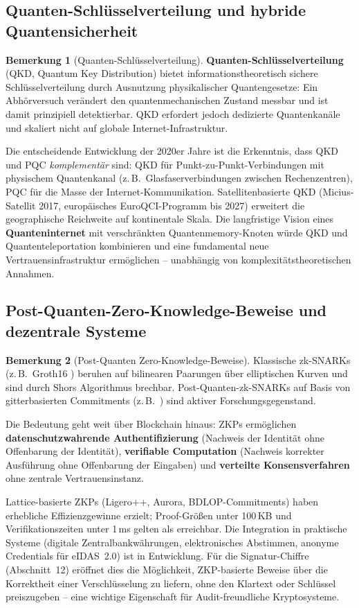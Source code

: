 ﻿\documentclass[a4paper,12pt]{article}
\theoremstyle{definition}
\newtheorem{bemerkung}{Bemerkung}[section]
\begin{document}
\subsection{Quanten-Schlüsselverteilung und hybride Quantensicherheit}

\begin{bemerkung}[Quanten-Schlüsselverteilung]
\textbf{Quanten-Schlüsselverteilung} (QKD, Quantum Key Distribution)
\cite{BB84} bietet informationstheoretisch sichere Schlüsselverteilung
durch Ausnutzung physikalischer Quantengesetze: Ein Abhörversuch
verändert den quantenmechanischen Zustand messbar und ist damit
prinzipiell detektierbar. QKD erfordert jedoch dedizierte
Quantenkanäle und skaliert nicht auf globale Internet-Infrastruktur.

Die entscheidende Entwicklung der 2020er Jahre ist die Erkenntnis,
dass QKD und PQC \emph{komplementär} sind: QKD für
Punkt-zu-Punkt-Verbindungen mit physischem Quantenkanal
(z.\,B.\ Glasfaserverbindungen zwischen Rechenzentren),
PQC für die Masse der Internet-Kommunikation.
Satellitenbasierte QKD (Micius-Satellit 2017, europäisches
EuroQCI-Programm bis 2027) erweitert die geographische Reichweite
auf kontinentale Skala. Die langfristige Vision eines
\textbf{Quanteninternet} mit verschränkten Quantenmemory-Knoten
würde QKD und Quantenteleportation kombinieren und eine fundamental
neue Vertrauensinfrastruktur ermöglichen -- unabhängig von
komplexitätstheoretischen Annahmen.
\end{bemerkung}

\subsection{Post-Quanten-Zero-Knowledge-Beweise und dezentrale Systeme}

\begin{bemerkung}[Post-Quanten Zero-Knowledge-Beweise]
Klassische zk-SNARKs (z.\,B.\ Groth16 \cite{Gro16}) beruhen auf
bilinearen Paarungen über elliptischen Kurven und sind durch
Shors Algorithmus brechbar. Post-Quanten-zk-SNARKs auf Basis
von gitterbasierten Commitments (z.\,B.\ \cite{BFRS23}) sind
aktiver Forschungsgegenstand.

Die Bedeutung geht weit über Blockchain hinaus:
ZKPs ermöglichen \textbf{datenschutzwahrende Authentifizierung}
(Nachweis der Identität ohne Offenbarung der Identität),
\textbf{verifiable Computation} (Nachweis korrekter Ausführung
ohne Offenbarung der Eingaben) und
\textbf{verteilte Konsensverfahren} ohne zentrale Vertrauensinstanz.

Lattice-basierte ZKPs (Ligero++, Aurora, BDLOP-Commitments)
haben erhebliche Effizienzgewinne erzielt; Proof-Größen unter
100\,KB und Verifikationszeiten unter 1\,ms gelten als erreichbar.
Die Integration in praktische Systeme (digitale Zentralbankwährungen,
elektronisches Abstimmen, anonyme Credentials für eIDAS~2.0) ist
in Entwicklung. Für die Signatur-Chiffre (Abschnitt~12) eröffnet
dies die Möglichkeit, ZKP-basierte Beweise über die Korrektheit
einer Verschlüsselung zu liefern, ohne den Klartext oder Schlüssel
preiszugeben -- eine wichtige Eigenschaft für Audit-freundliche
Kryptosysteme.
\end{bemerkung}
\end{document}
